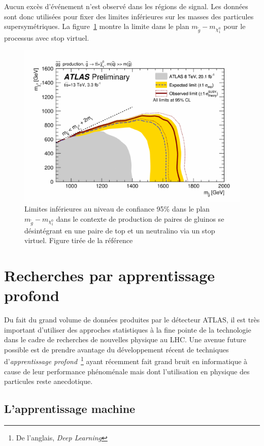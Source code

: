 Aucun excès d'événement n'est observé dans les régions de signal.  Les
données sont donc utilisées pour fixer des limites inférieures sur les
masses des particules supersymétriques. La figure~\ref{fig:limit}
montre la limite dans le plan $m_{\tilde{g}}-m_{\chi_1^0}$ pour le
processus avec stop virtuel.

\begin{figure}[h!]
  \centering
  \includegraphics[width=.65\textwidth]{limit.pdf}
  \caption{Limites inférieures au niveau de confiance 95\% dans le
    plan $m_{\tilde{g}}-m_{\chi_1^0}$ dans le contexte de production
    de paires de gluinos se désintégrant en une paire de top et un
    neutralino via un stop virtuel.  Figure tirée de la
    référence~\cite{ATLAS-CONF-2015-067}}
  \label{fig:limit}
\end{figure}

\clearpage{}

\section{Recherches par apprentissage profond}
\label{sec:susy_atlas:dl}

Du fait du grand volume de données produites par le détecteur ATLAS,
il est très important d'utiliser des approches statistiques à la
fine pointe de la technologie dans le cadre de recherches de nouvelles
physique au LHC. Une avenue future possible est de prendre avantage du
développement récent de techniques d'\emph{apprentissage
  profond}~\footnote{De l'anglais, \emph{Deep Learning}} ayant
récemment fait grand bruit en informatique à cause de leur performance
phénoménale mais dont l'utilisation en physique des particules reste
anecdotique.
 
\subsection{L'apprentissage machine}
\label{sec:susy_atlas:dl:ml}

